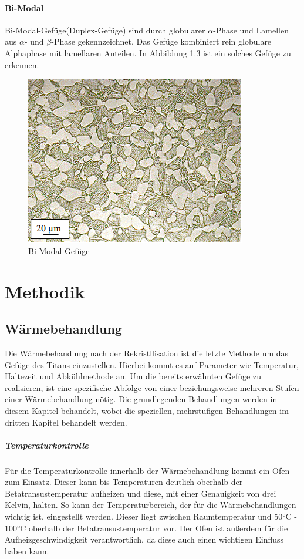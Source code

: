 \documentclass[a4paper, 11pt]{tubsreprt}
\begin{document}
\subsubsection{Bi-Modal}
Bi-Modal-Gefüge(Duplex-Gefüge) sind durch globularer $\alpha$-Phase und Lamellen aus $\alpha$- und $\beta$-Phase gekennzeichnet. Das Gefüge kombiniert rein globulare Alphaphase mit lamellaren Anteilen. In Abbildung 1.3 ist ein solches Gefüge zu erkennen. 
\begin{figure}
\centering
\includegraphics[scale=1]{Bilder/Duplexgefuege.PNG}
\caption[Bi-Modal-Gefüge]{Bi-Modal-Gefüge\cite{Werkstoffdesign2012}}
\label{fig5}
\end{figure}

\chapter{Methodik}
\section{Wärmebehandlung}

Die Wärmebehandlung nach der Rekristllisation ist die letzte Methode um das Gefüge des Titans einzustellen. Hierbei kommt es auf Parameter wie Temperatur, Haltezeit und Abkühlmethode an. Um die bereits erwähnten Gefüge zu realisieren, ist eine spezifische Abfolge von einer beziehungsweise mehreren Stufen einer Wärmebehandlung nötig. Die grundlegenden Behandlungen werden in diesem Kapitel behandelt, wobei die speziellen, mehrstufigen Behandlungen im dritten Kapitel behandelt werden.
\paragraph{Temperaturkontrolle}
Für die Temperaturkontrolle innerhalb der Wärmebehandlung kommt ein Ofen zum Einsatz. Dieser kann bis Temperaturen deutlich oberhalb der Betatransustemperatur aufheizen und diese, mit einer Genauigkeit von drei Kelvin, halten. So kann der Temperaturbereich, der für die Wärmebehandlungen wichtig ist, eingestellt werden. Dieser liegt zwischen Raumtemperatur und 50°C - 100°C oberhalb der Betatransustemperatur vor. Der Ofen ist außerdem für die Aufheizgeschwindigkeit verantwortlich, da diese auch einen wichtigen Einfluss haben kann.
\end{document}

